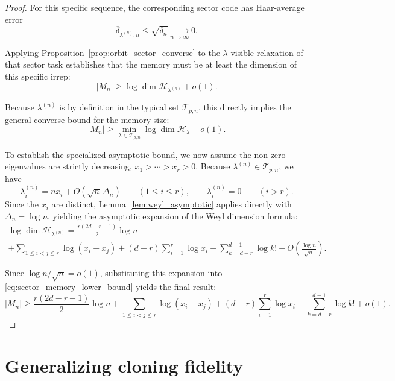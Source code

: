 \documentclass[a4paper,onecolumn,11pt]{quantumarticle}
\def\h{\mathcal{H}}
\begin{document}
\begin{proof}
For this specific sequence, the corresponding sector code has Haar-average error
\begin{equation}
\overline \delta_{\lambda^{(n)},n}\le \sqrt{\delta_n}\xrightarrow[n\to\infty]{}0.
\end{equation}

Applying Proposition~\ref{prop:orbit_sector_converse} to the $\lambda$-visible relaxation of that sector task establishes that the memory must be at least the dimension of this specific irrep:
\begin{equation}\label{eq:sector_memory_lower_bound}
    |M_n|
    \ge
    \log \dim \h_{\lambda^{(n)}} + o(1).
\end{equation}

Because $\lambda^{(n)}$ is by definition in the typical set $\mathcal T_{p,n}$, this directly implies the general converse bound for the memory size:
\begin{equation}
    |M_n| \ge \min_{\lambda \in \mathcal T_{p,n}} \log \dim \h_{\lambda} + o(1).
\end{equation}

To establish the specialized asymptotic bound, we now assume the non-zero eigenvalues are strictly decreasing, $x_1>\cdots>x_r>0$.
Because $\lambda^{(n)}\in \mathcal T_{p,n}$, we have
\begin{equation}
\lambda^{(n)}_i = nx_i + O(\sqrt n\,\Delta_n)
\qquad (1\le i\le r),
\qquad
\lambda^{(n)}_i=0
\qquad (i>r).
\end{equation}
Since the $x_i$ are distinct, Lemma~\ref{lem:weyl_asymptotic} applies directly with $\Delta_n=\log n$, yielding the asymptotic expansion of the Weyl dimension formula:
\begin{multline}
    \log \dim \h_{\lambda^{(n)}} =
    \frac{r(2d-r-1)}{2}\log n \\
    + \sum_{1\le i<j\le r}\log (x_i-x_j)
    + (d-r)\sum_{i=1}^r \log x_i
    - \sum_{k=d-r}^{d-1}\log k!
    + O\!\left(\frac{\log n}{\sqrt n}\right).
\end{multline}

Since $\log n/\sqrt n=o(1)$, substituting this expansion into \eqref{eq:sector_memory_lower_bound} yields the final result:
\[
    |M_n|\ge\frac{r(2d-r-1)}{2}\log n
    + \sum_{1\le i<j\le r}\log (x_i-x_j)
    + (d-r)\sum_{i=1}^r \log x_i
    - \sum_{k=d-r}^{d-1}\log k!
    + o(1).
\]
\end{proof}


\section{Generalizing cloning fidelity}\label{sec:fidelity}
\end{document}
